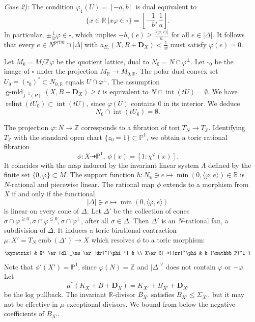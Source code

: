 \documentclass[12pt,twoside]{amsart}
\newcommand{\Z}{{\mathbb Z}}
\newcommand{\R}{{\mathbb R}}
\newcommand{\bP}{{\mathbb P}} %
\newcommand{\bD}{{\mathbf D}}
\newcommand{\emb}{\operatorname{emb}}
\newcommand{\Int}{\operatorname{int}}
\newcommand{\gmld}{\operatorname{g-mld}}
\newcommand{\relint}{\operatorname{relint}}
\theoremstyle{plain}
\theoremstyle{definition}
\theoremstyle{remark}
\begin{document}
{\em Case 2):} The condition $\varphi_1(U)=[-a,b]$ is dual equivalent to 
$$
\{x\in \R \ | x\varphi \in \square \}=[-\frac{1}{b},\frac{1}{a}].
$$
In particular, $\pm \frac{1}{w}\varphi \in \square$, which implies
$
-h_\square(e)\ge \frac{|\langle \varphi ,e\rangle |}{w}
$
for all $e\in |\Delta|$.
It follows that every $e\in N^{prim}\cap |\Delta|$ with $a_{E_e}(X,B+\bD_X)<\frac{1}{w}$
must satisfy $\varphi(e)=0$.

Let $M_0=M/\Z\varphi$ be the quotient lattice, dual to $N_0=N\cap \varphi^\perp$.
Let $\square_0$ be the image of $\square$ under the projection 
$M_\R\to M_{0,\R}$. The polar dual convex set $U_0=(\square_0)^*\subset N_{0,\R}$ equals $U\cap \varphi^\perp$.
The assumption $\gmld_{f^{-1}(P)}(X,B+\bD_X)\ge t$ is equivalent to 
$N\cap \Int(tU)=\emptyset$. We have $\relint(tU_0)\subset \Int(tU)$, since 
$\varphi(U)$ contains $0$ in its interior. We deduce
$$
N_0 \cap \Int(t U_0)=\emptyset.
$$

The projection $\varphi\colon N\to \Z$ corresponds to a fibration of tori
$T_N\to T_\Z$. Identifying $T_\Z$ with the standard open chart $\{z_0=1\}\subset \bP^1$,
we obtain a toric rational fibration 
$$
\phi \colon X\dashrightarrow  \bP^1, \ \phi (x)=[1:\chi^\varphi(x)].
$$ 
It coincides with the map induced by the invariant linear
system $\Lambda$ defined by the finite set $\{0,\varphi\}\subset M$. The support function
$h\colon N_\R\ni e\mapsto \min(0,\langle \varphi,e\rangle)\in \R$ is $N$-rational
and piecewise linear.  The rational map $\phi$ extends to a morphism from $X$ 
if and only if the functional 
$$
|\Delta|\ni e\mapsto \min(0, \langle \varphi,e\rangle)
$$
is linear on every cone of $\Delta$. 
Let $\Delta'$ be the collection of cones 
$\sigma\cap \varphi^{\ge 0}, \sigma\cap \varphi^{\le 0}, \sigma\cap \varphi^\perp$, after all $\sigma\in \Delta$.
Then $\Delta'$ is an $N$-rational fan, a subdivision of $\Delta$. It induces a toric birational contraction 
$\mu\colon X'=T_N\emb(\Delta') \to X$ which resolves  $\phi$ to a toric morphism:
\[ \xymatrix{
	& X' \ar[dl]_\mu \ar[dr]^{\phi'} & \\
	X\ar@{-->}[rr]^\phi  & & \bP^1
} \]
Note that $\phi'(X')=\bP^1$, since $\varphi(N)=\Z$ and $|\Delta|^\vee$
does not contain $\varphi$ or $-\varphi$. 
Let 
$$
\mu^*(K_X+B+\bD_X)=K_{X'}+B_{X'}+\bD_{X'}
$$ 
be the log pullback. The invariant $\R$-divisor
$B_{X'}$ satisfies $B_{X'} \le \Sigma_{X'}$, but it may not be effective in $\mu$-exceptional divisors.
We bound from below the negative coefficients of $B_{X'}$.
\end{document}
